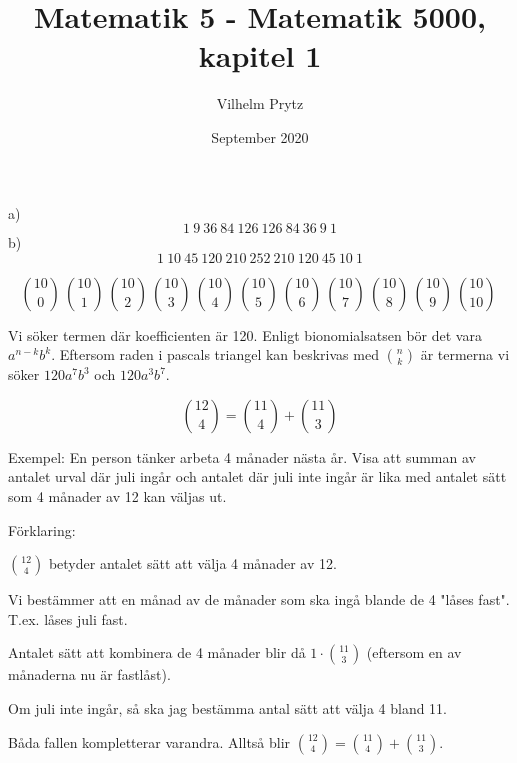 \documentclass{article}
\title{Matematik 5 - Matematik 5000, kapitel 1}
\author{Vilhelm Prytz}
\date{September 2020}
\begin{document}
\maketitle

\setcounter{Exercise}{1191}

\begin{Exercise}
    a)
    \[
        1 \ 9 \ 36 \ 84 \ 126 \ 126 \ 84 \ 36 \ 9 \ 1
    \]
    b)
    \[
        1 \ 10 \ 45 \ 120 \ 210 \ 252 \ 210 \ 120 \ 45 \ 10 \ 1
    \]

    \[
        \binom{10}{0} \ \binom{10}{1} \ \binom{10}{2} \ \binom{10}{3} \ \binom{10}{4} \ \binom{10}{5} \
        \binom{10}{6} \ \binom{10}{7} \ \binom{10}{8} \ \binom{10}{9} \ \binom{10}{10} \
    \]

    Vi söker termen där koefficienten är 120. Enligt bionomialsatsen bör det vara \(a^{n-k}b^k\).
    Eftersom raden i pascals triangel kan beskrivas med \(\binom{n}{k}\) är termerna vi söker \(120a^7b^3\) och \(120a^3b^7\).

\end{Exercise}

\setcounter{Exercise}{1195}
\begin{Exercise}

    \[
        \binom{12}{4} = \binom{11}{4} + \binom{11}{3}
    \]

    Exempel: En person tänker arbeta 4 månader nästa år. Visa att summan av antalet urval där juli ingår och antalet där juli inte ingår är lika med antalet sätt som 4 månader av 12 kan väljas ut. \newline

    Förklaring:

    \( \binom{12}{4} \) betyder antalet sätt att välja 4 månader av 12.

    Vi bestämmer att en månad av de månader som ska ingå blande de 4 "låses fast". T.ex. låses juli fast.

    Antalet sätt att kombinera de 4 månader blir då \(1 \cdot \binom{11}{3}\) (eftersom en av månaderna nu är fastlåst).

    Om juli inte ingår, så ska jag bestämma antal sätt att välja 4 bland 11.

    Båda fallen kompletterar varandra. Alltså blir \( \binom{12}{4} = \binom{11}{4} + \binom{11}{3} \).

\end{Exercise}
\end{document}
